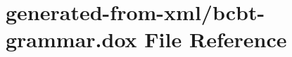 \hypertarget{bcbt-grammar_8dox}{}\section{generated-\/from-\/xml/bcbt-\/grammar.dox File Reference}
\label{bcbt-grammar_8dox}
